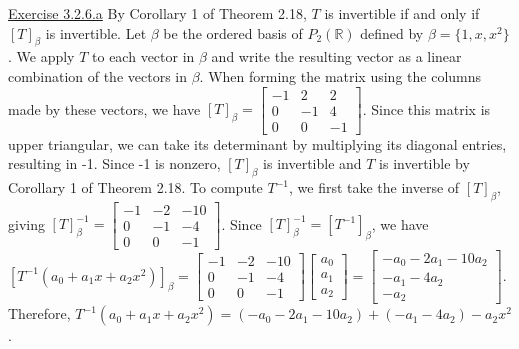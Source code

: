 \documentclass{exam}
\begin{document}
\underline{Exercise 3.2.6.a}
\newline
\newline
By Corollary 1 of Theorem 2.18, $T$ is invertible if and only if $[T]_\beta$ is invertible. Let $\beta$ be the ordered basis of $P_2(\mathbb{R})$ defined by $\beta=\{1,x,x^2\}$. We apply $T$ to each vector in $\beta$ and write the resulting vector as a linear combination of the vectors in $\beta$. When forming the matrix using the columns made by these vectors, we have $[T]_\beta=
\begin{bmatrix}
    -1 & 2 & 2 \\
    0 & -1 & 4 \\
    0 & 0 & -1
\end{bmatrix}$. Since this matrix is upper triangular, we can take its determinant by multiplying its diagonal entries, resulting in -1. Since -1 is nonzero, $[T]_\beta$ is invertible and $T$ is invertible by Corollary 1 of Theorem 2.18. To compute $T^{-1}$, we first take the inverse of $[T]_\beta$, giving $[T]_\beta^{-1}=
\begin{bmatrix}
    -1 & -2 & -10 \\
    0 & -1 & -4 \\
    0 & 0 & -1
\end{bmatrix}$. Since $[T]_\beta^{-1}=[T^{-1}]_\beta$, we have $[T^{-1}(a_0+a_1x+a_2x^2)]_\beta=
\begin{bmatrix}
    -1 & -2 & -10 \\
    0 & -1 & -4 \\
    0 & 0 & -1
\end{bmatrix}
\begin{bmatrix}
    a_0 \\
    a_1 \\
    a_2
\end{bmatrix}=
\begin{bmatrix}
    -a_0-2a_1-10a_2 \\
    -a_1-4a_2 \\
    -a_2
\end{bmatrix}$. Therefore, $T^{-1}(a_0+a_1x+a_2x^2)=(-a_0-2a_1-10a_2)+(-a_1-4a_2)-a_2x^2$.
\newline
\end{document}
